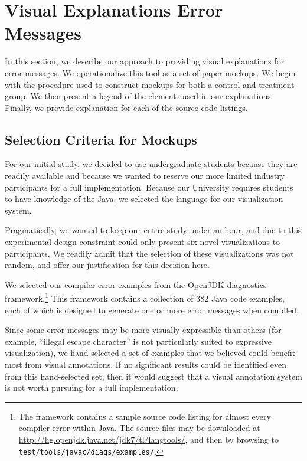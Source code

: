 \documentclass[conference]{IEEEtran}
\begin{document}
\section{Visual Explanations Error Messages}
\label{sec:motivation}

In this section, we describe our approach to providing visual explanations for error messages. We operationalize this tool as a set of paper mockups. We begin with the procedure used to construct mockups for both a control and treatment group. We then present a legend of the elements used in our explanations. Finally, we provide explanation for each of the source code listings.

\subsection{Selection Criteria for Mockups}

For our initial study, we decided to use undergraduate students because they are readily available and because we wanted to reserve our more limited industry participants for a full implementation. Because our University requires students to have knowledge of the Java, we selected the language for our visualization system.

Pragmatically, we wanted to keep our entire study under an hour, and due to this experimental design constraint could only present six novel visualizations to participants. We readily admit that the selection of these visualizations was not random, and offer our justification for this decision here. 

We selected our compiler error examples from the OpenJDK diagnostics framework.\footnote{The framework contains a sample source code listing for almost every compiler error within Java. The source files may be downloaded at \url{http://hg.openjdk.java.net/jdk7/tl/langtools/}, and then by browsing to \texttt{test/tools/javac/diags/examples/}.} This framework contains a collection of 382 Java code examples, each of which is designed to generate one or more error messages when compiled.

Since some error messages may be more visually expressible than others (for example, ``illegal escape character'' is not particularly suited to expressive visualization), we hand-selected a set of examples that we believed could benefit most from visual annotations. If no significant results could be identified even from this hand-selected set, then it would suggest that a visual annotation system is not worth pursuing for a full implementation.
\end{document}
